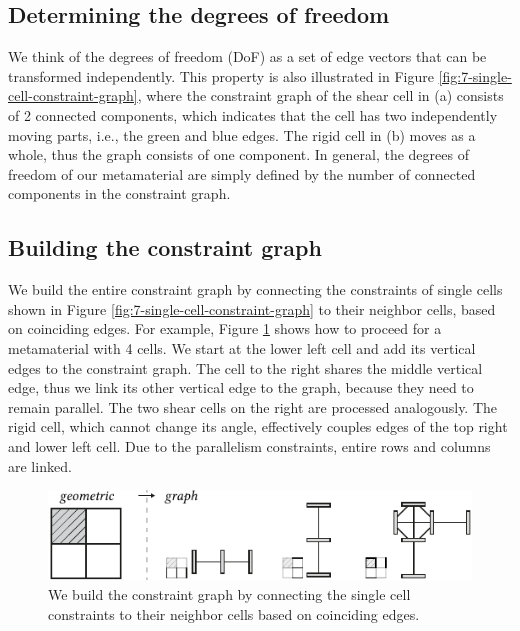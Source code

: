 \subsection{Determining the degrees of freedom}

We think of the degrees of freedom (DoF) as a set of edge vectors that can be transformed independently. This property is also illustrated in Figure \ref{fig:7-single-cell-constraint-graph}, where the constraint graph of the shear cell in (a) consists of 2 connected components, which indicates that the cell has two independently moving parts, i.e., the green and blue edges. The rigid cell in (b) moves as a whole, thus the graph consists of one component. In general, the degrees of freedom of our metamaterial are simply defined by the number of connected components in the constraint graph.


\subsection{Building the constraint graph}

We build the entire constraint graph by connecting the constraints of single cells shown in Figure \ref{fig:7-single-cell-constraint-graph} to their neighbor cells, based on coinciding edges. For example, Figure \ref{fig:8-constraint-graph} shows how to proceed for a metamaterial with 4 cells. We start at the lower left cell and add its vertical edges to the constraint graph. The cell to the right shares the middle vertical edge, thus we link its other vertical edge to the graph, because they need to remain parallel. The two shear cells on the right are processed analogously.  The rigid cell, which cannot change its angle, effectively couples edges of the top right and lower left cell. Due to the parallelism constraints, entire rows and columns are linked. 

\begin{figure} [h]
    \includegraphics[width=\textwidth]{chapters/understanding-metamaterial-mechanisms-FIG/8-constraint-graph.pdf}
    \caption[Short figure name.]{We build the constraint graph by connecting the single cell constraints to their neighbor cells based on coinciding edges. 
    \label{fig:8-constraint-graph}}
\end{figure}

